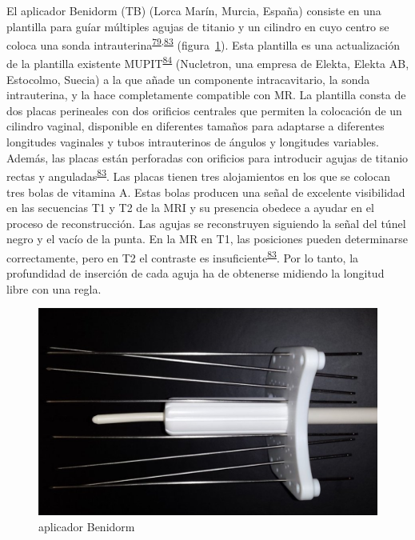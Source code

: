 \documentclass[
  a4paper,
]{scrreprt}
\begin{document}
El aplicador Benidorm (TB) (Lorca Marín, Murcia, España) consiste en una
plantilla para guíar múltiples agujas de titanio y un cilindro en cuyo
centro se coloca una sonda
intrauterina\textsuperscript{\protect\hyperlink{ref-villalba2015}{79},\protect\hyperlink{ref-richart2015}{83}}
(figura~\ref{fig-tbimage}). Esta plantilla es una actualización de la
plantilla existente
MUPIT\textsuperscript{\protect\hyperlink{ref-gynecolo2011}{84}}
(Nucletron, una empresa de Elekta, Elekta AB, Estocolmo, Suecia) a la
que añade un componente intracavitario, la sonda intrauterina, y la hace
completamente compatible con MR. La plantilla consta de dos placas
perineales con dos orificios centrales que permiten la colocación de un
cilindro vaginal, disponible en diferentes tamaños para adaptarse a
diferentes longitudes vaginales y tubos intrauterinos de ángulos y
longitudes variables. Además, las placas están perforadas con orificios
para introducir agujas de titanio rectas y
anguladas\textsuperscript{\protect\hyperlink{ref-richart2015}{83}}. Las
placas tienen tres alojamientos en los que se colocan tres bolas de
vitamina A. Estas bolas producen una señal de excelente visibilidad en
las secuencias T1 y T2 de la MRI y su presencia obedece a ayudar en el
proceso de reconstrucción. Las agujas se reconstruyen siguiendo la señal
del túnel negro y el vacío de la punta. En la MR en T1, las posiciones
pueden determinarse correctamente, pero en T2 el contraste es
insuficiente\textsuperscript{\protect\hyperlink{ref-richart2015}{83}}.
Por lo tanto, la profundidad de inserción de cada aguja ha de obtenerse
midiendo la longitud libre con una regla.

\begin{figure}

{\centering \includegraphics{img/TBfoto.png}

}

\caption{\label{fig-tbimage}aplicador Benidorm}

\end{figure}
\end{document}
